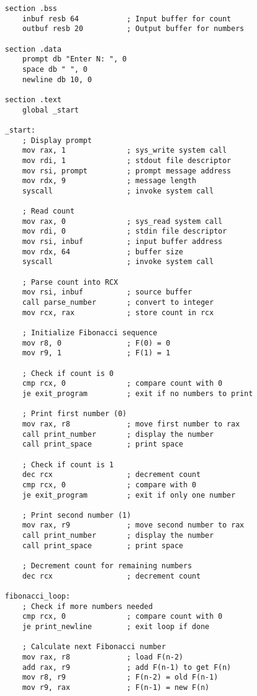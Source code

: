 \documentclass[12pt,a4paper]{article}
\begin{document}
\begin{lstlisting}[caption=64-bit Fibonacci Series Program]
section .bss
    inbuf resb 64           ; Input buffer for count
    outbuf resb 20          ; Output buffer for numbers

section .data
    prompt db "Enter N: ", 0
    space db " ", 0
    newline db 10, 0

section .text
    global _start

_start:
    ; Display prompt
    mov rax, 1              ; sys_write system call
    mov rdi, 1              ; stdout file descriptor
    mov rsi, prompt         ; prompt message address
    mov rdx, 9              ; message length
    syscall                 ; invoke system call

    ; Read count
    mov rax, 0              ; sys_read system call
    mov rdi, 0              ; stdin file descriptor
    mov rsi, inbuf          ; input buffer address
    mov rdx, 64             ; buffer size
    syscall                 ; invoke system call

    ; Parse count into RCX
    mov rsi, inbuf          ; source buffer
    call parse_number       ; convert to integer
    mov rcx, rax            ; store count in rcx

    ; Initialize Fibonacci sequence
    mov r8, 0               ; F(0) = 0
    mov r9, 1               ; F(1) = 1

    ; Check if count is 0
    cmp rcx, 0              ; compare count with 0
    je exit_program         ; exit if no numbers to print

    ; Print first number (0)
    mov rax, r8             ; move first number to rax
    call print_number       ; display the number
    call print_space        ; print space

    ; Check if count is 1
    dec rcx                 ; decrement count
    cmp rcx, 0              ; compare with 0
    je exit_program         ; exit if only one number

    ; Print second number (1)
    mov rax, r9             ; move second number to rax
    call print_number       ; display the number
    call print_space        ; print space

    ; Decrement count for remaining numbers
    dec rcx                 ; decrement count

fibonacci_loop:
    ; Check if more numbers needed
    cmp rcx, 0              ; compare count with 0
    je print_newline        ; exit loop if done

    ; Calculate next Fibonacci number
    mov rax, r8             ; load F(n-2)
    add rax, r9             ; add F(n-1) to get F(n)
    mov r8, r9              ; F(n-2) = old F(n-1)
    mov r9, rax             ; F(n-1) = new F(n)


\end{lstlisting}
\end{document}
